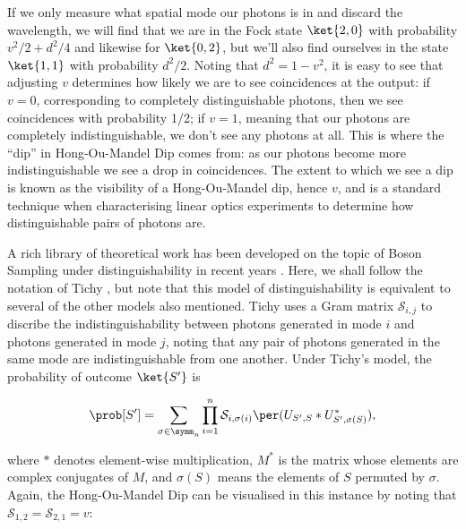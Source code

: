 If we only measure what spatial mode our photons is in and discard the wavelength, we will find that we are in the Fock state $\ket{2,0}$ with probability $v^2/2 + d^2/4$ and likewise for $\ket{0,2}$, but we'll also find ourselves in the state $\ket{1,1}$ with probability $d^2/2$. Noting that $d^2 = 1-v^2$, it is easy to see that adjusting $v$ determines how likely we are to see coincidences at the output: if $v=0$, corresponding to completely distinguishable photons, then we see coincidences with probability 1/2; if $v=1$, meaning that our photons are completely indistinguishable, we don't see any photons at all. This is where the ``dip'' in Hong-Ou-Mandel Dip comes from: as our photons become more indistinguishable we see a drop in coincidences. The extent to which we see a dip is known as the visibility of a Hong-Ou-Mandel dip, hence $v$, and is a standard technique when characterising linear optics experiments to determine how distinguishable pairs of photons are.

A rich library of theoretical work has been developed on the topic of Boson Sampling under distinguishability in recent years \cite{rohde2015, shchesnovich2015, tichy2015, tamma2016nonidentical, menssen2017}. Here, we shall follow the notation of Tichy \cite{tichy2015}, but note that this model of distinguishability is equivalent to several of the other models also mentioned. Tichy uses a Gram matrix $\mathcal{S}_{i,j}$ to discribe the indistinguishability between photons generated in mode $i$ and photons generated in mode $j$, noting that any pair of photons generated in the same mode are indistinguishable from one another. Under Tichy's model, the probability of outcome $\ket{S'}$ is

\begin{equation}
\prob[S'] = \sum_{\sigma\in\symm_n}\prod_{i=1}^n\mathcal{S}_{i,\sigma(i)}\per(U_{S',S}*U_{S',\sigma(S)}^*),
\end{equation}

\noindent where $*$ denotes element-wise multiplication, $M^*$ is the matrix whose elements are complex conjugates of $M$, and $\sigma(S)$ means the elements of $S$ permuted by $\sigma$. Again, the Hong-Ou-Mandel Dip can be visualised in this instance by noting that $\mathcal{S}_{1,2} = \mathcal{S}_{2,1} = v$:

